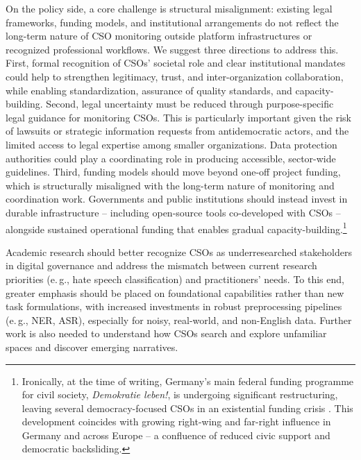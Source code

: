 \documentclass[acmsmall]{acmart}
\begin{document}
On the policy side, a core challenge is structural misalignment: existing legal frameworks, funding models, and institutional arrangements do not reflect the long-term nature of CSO monitoring outside platform infrastructures or recognized professional workflows. We suggest three directions to address this. 
First, formal recognition of CSOs' societal role and clear institutional mandates could help to strengthen legitimacy, trust, and inter-organization collaboration, while enabling standardization, assurance of quality standards, and capacity-building. 
Second, legal uncertainty must be reduced through purpose-specific legal guidance for monitoring CSOs. This is particularly important given the risk of lawsuits or strategic information requests from antidemocratic actors, and the limited access to legal expertise among smaller organizations. Data protection authorities could play a coordinating role in producing accessible, sector-wide guidelines. 
Third, funding models should move beyond one-off project funding, which is structurally misaligned with the long-term nature of monitoring and coordination work. Governments and public institutions should instead invest in durable infrastructure -- including open-source tools co-developed with CSOs -- alongside sustained operational funding that enables gradual capacity-building.\footnote{Ironically, at the time of writing, Germany's main federal funding programme for civil society, \textit{Demokratie leben!}, is undergoing significant restructuring, leaving several democracy-focused CSOs in an existential funding crisis \cite{tagesschau_2026}. This development coincides with growing right-wing and far-right influence in Germany and across Europe -- a confluence of reduced civic support and democratic backsliding.}


Academic research should better recognize CSOs as underresearched stakeholders in digital governance and address the mismatch between current research priorities (e.\,g., hate speech classification) and practitioners' needs. 
To this end, greater emphasis should be placed on foundational capabilities rather than new task formulations, with increased investments in robust preprocessing pipelines (e.\,g., NER, ASR), especially for noisy, real-world, and non-English data. Further work is also needed to understand how CSOs search and explore unfamiliar spaces and discover emerging narratives. 
\end{document}
